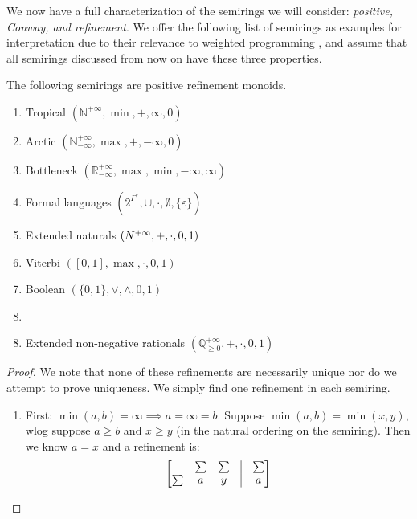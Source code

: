 \documentclass[a4paper,UKenglish,cleveref, autoref, thm-restate]{lipics-v2021}
\newcommand{\exN}{\mathbb{N}^{+\infty}}
\newcommand{\exQp}{\mathbb{Q}_{\geq0}^{+\infty}}
\theoremstyle{plain}\newtheoremrep{thm}{Theorem}[section]
\begin{document}
	We now have a full characterization of the semirings we will consider: \emph{positive, Conway, and refinement}. We offer the following list of semirings as examples for interpretation due to their relevance to weighted programming \cite{batz2022weighted}, and assume that all semirings discussed from now on have these three properties.
	\begin{toappendix}
		\begin{lem}
			The following semirings are positive refinement monoids.
			\begin{multicols}{2}
				\begin{enumerate}[nosep]
					\item Tropical $(\exN, \min, +, \infty, 0)$
					\item Arctic  $(\mathbb N^{+\infty}_{-\infty}, \max, +, -\infty, 0)$
					\item Bottleneck  $(\mathbb R^{+\infty}_{-\infty}, \max, \min, -\infty, \infty)$
					\item Formal languages  $(2^{\Gamma^*}, \cup, \cdot, \emptyset, \{\varepsilon\})$
					\item Extended naturals  $(\mathbb \exN, +, \cdot, 0, 1)$
					\item Viterbi  $([0,1], \max, \cdot, 0, 1)$
					\item Boolean  $(\{0,1\}, \lor, \land, 0, 1)$
					\item[]
				\end{enumerate}
			\end{multicols}
			\begin{enumerate}[nosep]
				\setcounter{enumi}{7}
				\item Extended non-negative rationals $(\exQp, +, \cdot, 0, 1)$
			\end{enumerate}\label{posrefsemis}
		\end{lem}
		\begin{proof}
			We note that none of these refinements are necessarily unique nor do we attempt to prove uniqueness. We simply find one refinement in each semiring.
			\begin{enumerate}
				\item First: $\min(a,b) = \infty \implies a = \infty = b$. Suppose $\min(a,b) = \min(x,y)$, wlog suppose $a\geq b$ and $x\geq y$ (in the natural ordering on the semiring). Then we know $a=x$ and a refinement is:
				$$
				\begin{bmatrix}
					&\sum & \sum &\vline & \sum \\
					\sum&a & y& \vline & a \\

\end{bmatrix}$$
\end{enumerate}
\end{proof}
\end{toappendix}
\end{document}
